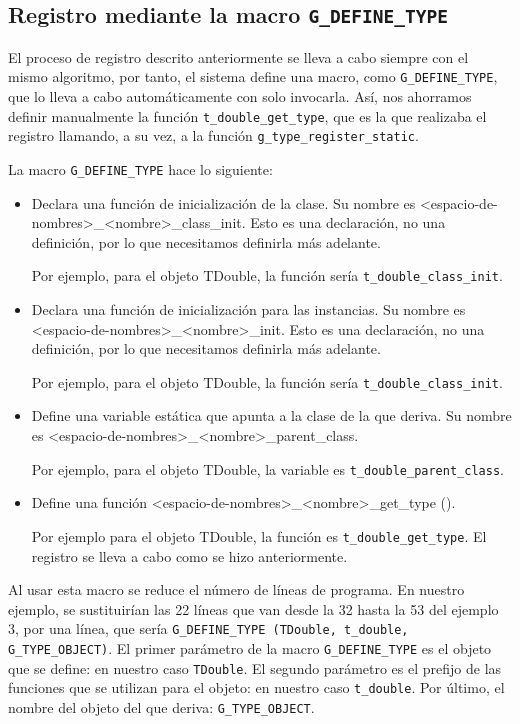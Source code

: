 \subsection{Registro mediante la macro \texttt{G\_DEFINE\_TYPE}}
El proceso de registro descrito anteriormente se lleva a cabo siempre con el mismo algoritmo, por tanto,
el sistema define una macro, como \texttt{G\_DEFINE\_TYPE},  que lo lleva a cabo automáticamente
con solo invocarla.  Así, nos ahorramos definir manualmente la función \texttt{t\_double\_get\_type},
que es la que realizaba el registro llamando, a su vez,  a la función \texttt{g\_type\_register\_static}.

La macro \texttt{G\_DEFINE\_TYPE} hace lo siguiente:
\begin{itemize}
  \tightlist
\item Declara una función de inicialización de la clase. Su nombre es \textsf{<espacio-de-nombres>\_<nombre>\_class\_init}. Esto es una declaración, no una definición,
  por lo que necesitamos definirla más adelante.

  Por ejemplo, para el objeto \textsf{TDouble}, la función sería \texttt{t\_double\_class\_init}.
\item Declara una función de inicialización para las instancias. Su nombre es
  \textsf{<espacio-de-nombres>\_<nombre>\_init}.
  Esto es una declaración, no una definición, por lo que necesitamos definirla más adelante.

  Por ejemplo, para el objeto \textsf{TDouble}, la función sería \texttt{t\_double\_class\_init}.
\item Define una variable estática que apunta a la clase de la que deriva. Su nombre es
  \textsf{<espacio-de-nombres>\_<nombre>\_parent\_class}.
  
  Por ejemplo, para el objeto \textsf{TDouble}, la variable es \texttt{t\_double\_parent\_class}.
\item Define una función \textsf{<espacio-de-nombres>\_<nombre>\_get\_type ()}.
  
  Por ejemplo para el objeto \textsf{TDouble}, la función es \texttt{t\_double\_get\_type}.
  El registro se lleva a cabo como se hizo anteriormente.
\end{itemize}

Al usar esta macro se reduce el número de líneas de programa. En nuestro ejemplo, se sustituirían
las 22 líneas que van desde la 32 hasta la 53 del ejemplo 3, por una línea, que sería
\texttt{G\_DEFINE\_TYPE (TDouble, t\_double, G\_TYPE\_OBJECT)}.
El primer parámetro de la macro \texttt{G\_DEFINE\_TYPE} es el objeto que se define: en nuestro
caso \texttt{TDouble}. El segundo parámetro es el prefijo de las funciones que se utilizan para el
objeto: en nuestro caso \texttt{t\_double}. Por último, el nombre del objeto del que deriva:
\texttt{G\_TYPE\_OBJECT}.

